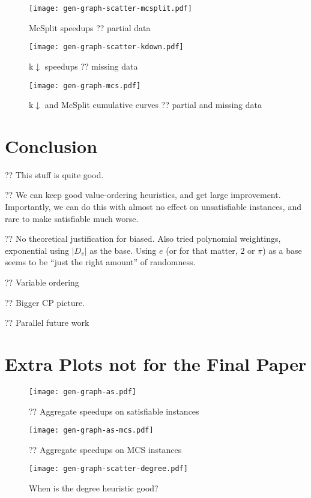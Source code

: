 \documentclass{article}
\begin{document}
\begin{figure}[p]
    \centering
    \texttt{[image: gen-graph-scatter-mcsplit.pdf]}
    \caption{McSplit speedups ?? partial data}\label{figure:mcsplit}
\end{figure}

\begin{figure}[p]
    \centering
    \texttt{[image: gen-graph-scatter-kdown.pdf]}
    \caption{k${\downarrow}$ speedups ?? missing data}\label{figure:kdown}
\end{figure}

\begin{figure}[p]
    \centering
    \texttt{[image: gen-graph-mcs.pdf]}
    \caption{k${\downarrow}$ and McSplit cumulative curves ?? partial and missing
    data}\label{figure:mcs}
\end{figure}

\section{Conclusion}

?? This stuff is quite good.

?? We can keep good value-ordering heuristics, and get large improvement. Importantly, we can do
this with almost no effect on unsatisfiable instances, and rare to make satisfiable much worse.

?? No theoretical justification for biased. Also tried polynomial weightings, exponential using
$\left|D_v\right|$ as the base. Using $e$ (or for that matter, $2$ or $\pi$) as a base seems to be
``just the right amount'' of randomness.

?? Variable ordering

?? Bigger CP picture.

?? Parallel future work

\clearpage



\clearpage
\appendix

\section{Extra Plots not for the Final Paper}

\begin{figure}[h]
    \centering
    \texttt{[image: gen-graph-as.pdf]}
    \caption{?? Aggregate speedups on satisfiable instances}
\end{figure}

\begin{figure}[h]
    \centering
    \texttt{[image: gen-graph-as-mcs.pdf]}
    \caption{?? Aggregate speedups on MCS instances}
\end{figure}

\begin{figure}[h]
    \centering
    \texttt{[image: gen-graph-scatter-degree.pdf]}

    \caption{When is the degree heuristic good?}
    \label{figure:scatter-degree}
\end{figure}
\end{document}
